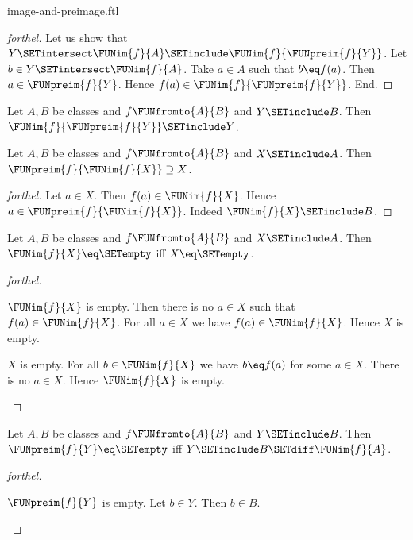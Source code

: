 \documentclass{naproche-library}
\begin{document}
\begin{smodule}[title=Computation Laws for Images and Preimages]{image-and-preimage.ftl}
\begin{proof}[forthel]
  Let us show that $Y \SETintersect \FUNim{f}{A} \SETinclude \FUNim{f}{\FUNpreim{f}{Y}}$.
    Let $b \in Y \SETintersect \FUNim{f}{A}$.
    Take $a \in A$ such that $b \eq f(a)$.
    Then $a \in \FUNpreim{f}{Y}$.
    Hence $f(a) \in \FUNim{f}{\FUNpreim{f}{Y}}$.
  End.
\end{proof}

\begin{corollary}[forthel,id=FOUNDATIONS_07_5585105345052672]
  Let $A, B$ be classes and $f \FUNfromto{A}{B}$ and $Y \SETinclude B$.
  Then $\FUNim{f}{\FUNpreim{f}{Y}} \SETinclude Y$.
\end{corollary}

\begin{proposition}[forthel,id=FOUNDATIONS_07_4890896170483712]
  Let $A, B$ be classes and $f \FUNfromto{A}{B}$ and $X \SETinclude A$.
  Then $\FUNpreim{f}{\FUNim{f}{X}} \supseteq X$.
\end{proposition}
\begin{proof}[forthel]
  Let $a \in X$.
  Then $f(a) \in \FUNim{f}{X}$.
  Hence $a \in \FUNpreim{f}{\FUNim{f}{X}}$.
  Indeed $\FUNim{f}{X} \SETinclude B$.
\end{proof}

\begin{proposition}[forthel,id=FOUNDATIONS_07_3318372355801088]
  Let $A, B$ be classes and $f \FUNfromto{A}{B}$ and $X \SETinclude A$.
  Then $\FUNim{f}{X} \eq \SETempty$ iff $X \eq \SETempty$.
\end{proposition}
\begin{proof}[forthel]
  \begin{case}{$\FUNim{f}{X}$ is empty.}
    Then there is no $a \in X$ such that $f(a) \in \FUNim{f}{X}$.
    For all $a \in X$ we have $f(a) \in \FUNim{f}{X}$.
    Hence $X$ is empty.
  \end{case}

  \begin{case}{$X$ is empty.}
    For all $b \in \FUNim{f}{X}$ we have $b \eq f(a)$ for some $a \in X$.
    There is no $a \in X$.
    Hence $\FUNim{f}{X}$ is empty.
  \end{case}
\end{proof}

\begin{proposition}[forthel,id=FOUNDATIONS_07_8597874786959360]
  Let $A, B$ be classes and $f \FUNfromto{A}{B}$ and $Y \SETinclude B$.
  Then $\FUNpreim{f}{Y} \eq \SETempty$ iff $Y \SETinclude B \SETdiff \FUNim{f}{A}$.
\end{proposition}
\begin{proof}[forthel]
  \begin{case}{$\FUNpreim{f}{Y}$ is empty.}
    Let $b \in Y$.
    Then $b \in B$.


\end{case}
\end{proof}
\end{smodule}
\end{document}
